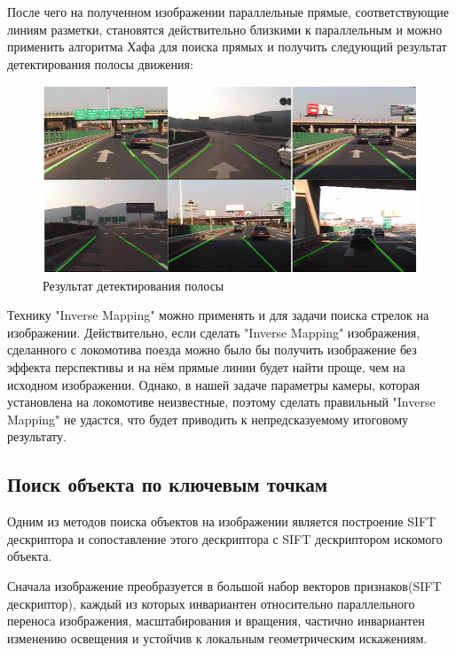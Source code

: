 После чего на полученном изображении параллельные прямые, соответствующие линиям разметки, становятся действительно близкими к параллельным и можно применить алгоритма Хафа для поиска прямых\cite{b:hough_transform} и получить следующий результат детектирования полосы движения:
\begin{figure}[h!]
	\centering
	\includegraphics[width=0.7\linewidth]{pictures/screenshot23235}
	\caption[Результат детектирования полосы]{Результат детектирования полосы}
	\label{fig:screenshot23235}
\end{figure}

Технику "Inverse Mapping" можно применять и для задачи поиска стрелок на изображении. Действительно, если сделать "Inverse Mapping" изображения, сделанного с локомотива поезда можно было бы получить  изображение без эффекта перспективы и на нём прямые линии будет найти проще, чем на исходном изображении. Однако, в нашей задаче параметры камеры, которая установлена на локомотиве неизвестные, поэтому сделать правильный "Inverse Mapping" не удастся, что будет приводить к непредсказуемому итоговому результату.

\newpage
\subsection{Поиск объекта по ключевым точкам}
Одним из методов поиска объектов на изображении является построение SIFT\cite{b:SIFT} дескриптора и сопоставление этого дескриптора с SIFT дескриптором искомого объекта.

Сначала изображение преобразуется в большой набор векторов признаков(SIFT дескриптор), каждый из которых инвариантен относительно параллельного переноса изображения, масштабирования и вращения, частично инвариантен изменению освещения и устойчив к локальным геометрическим искажениям.

